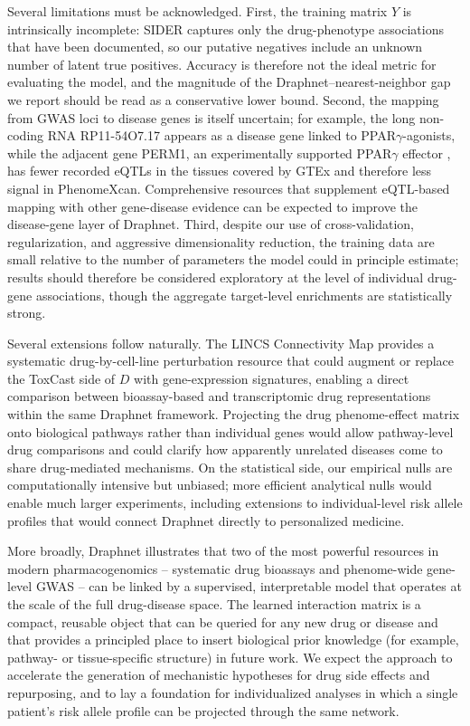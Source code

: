 \documentclass[11pt]{article}
\begin{document}
Several limitations must be acknowledged. First, the training matrix
$Y$ is intrinsically incomplete: SIDER captures only the drug-phenotype
associations that have been documented, so our putative negatives
include an unknown number of latent true positives. Accuracy is
therefore not the ideal metric for evaluating the model, and the
magnitude of the Draphnet--nearest-neighbor gap we report should be
read as a conservative lower bound. Second, the mapping from GWAS loci
to disease genes is itself uncertain; for example, the long non-coding
RNA RP11-54O7.17 appears as a disease gene linked to
PPAR$\gamma$-agonists, while the adjacent gene PERM1, an experimentally
supported PPAR$\gamma$ effector \citep{huang2022perm1}, has fewer
recorded eQTLs in the tissues covered by GTEx \citep{gtex2020atlas} and
therefore less signal in PhenomeXcan. Comprehensive resources that
supplement eQTL-based mapping with other gene-disease evidence can be
expected to improve the disease-gene layer of Draphnet. Third, despite
our use of cross-validation, regularization, and aggressive
dimensionality reduction, the training data are small relative to the
number of parameters the model could in principle estimate; results
should therefore be considered exploratory at the level of individual
drug-gene associations, though the aggregate target-level enrichments
are statistically strong.

Several extensions follow naturally. The LINCS Connectivity Map
\citep{subramanian2017lincs} provides a systematic drug-by-cell-line
perturbation resource that could augment or replace the ToxCast side
of $D$ with gene-expression signatures, enabling a direct comparison
between bioassay-based and transcriptomic drug representations within
the same Draphnet framework. Projecting the drug phenome-effect
matrix onto biological pathways rather than individual genes would
allow pathway-level drug comparisons and could clarify how apparently
unrelated diseases come to share drug-mediated mechanisms. On the
statistical side, our empirical nulls are computationally intensive
but unbiased; more efficient analytical nulls would enable much larger
experiments, including extensions to individual-level risk allele
profiles that would connect Draphnet directly to personalized
medicine.

More broadly, Draphnet illustrates that two of the most powerful
resources in modern pharmacogenomics -- systematic drug bioassays and
phenome-wide gene-level GWAS -- can be linked by a supervised,
interpretable model that operates at the scale of the full drug-disease
space. The learned interaction matrix is a compact, reusable object
that can be queried for any new drug or disease and that provides a
principled place to insert biological prior knowledge (for example,
pathway- or tissue-specific structure) in future work. We expect the
approach to accelerate the generation of mechanistic hypotheses for
drug side effects and repurposing, and to lay a foundation for
individualized analyses in which a single patient's risk allele
profile can be projected through the same network.



\end{document}
